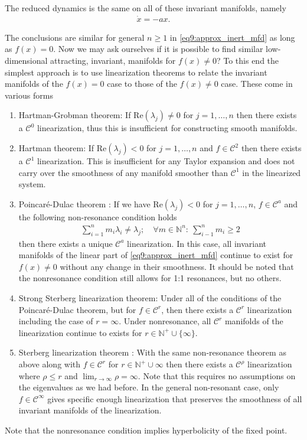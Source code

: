The reduced dynamics is the same on all of these invariant manifolds, namely
\begin{align}
	\dot{x} = -ax.
\end{align}

The conclusions are similar for general $n\geq 1$ in \ref{eq9:approx_inert_mfd} as long as $f(x) = 0$. Now we may ask ourselves if it is possible to find similar low-dimensional attracting, invariant, manifolds for $f(x) \neq 0$? To this end the simplest approach is to use linearization theorems to relate the invariant manifolds of the $f(x)=0$ case to those of the $f(x) \neq 0$ case. These come in various forms
\begin{enumerate}
	\item Hartman-Grobman theorem: If $ \textrm{Re} (\lambda_j) \neq 0$ for $j=1,\ldots,n$ then there exists a $\mathcal{C}^{0}$ linearization, thus this is insufficient for constructing smooth manifolds.
	\item Hartman theorem: If $ \textrm{Re} (\lambda_j)<0$ for $j=1,\ldots,n$ and $f\in \mathcal{C}^{2}$ then there exists a $\mathcal{C}^{1}$ linearization. This is insufficient for any Taylor expansion and does not carry over the smoothness of any manifold smoother than $\mathcal{C}^{1}$ in the linearized system.
	\item Poincaré-Dulac theorem \cite{poincare1951}: If we have $ \textrm{Re} (\lambda_j)<0$ for $j=1,\ldots,n$, $f\in \mathcal{C}^{a}$ and the following non-resonance condition holds
		\begin{align}
			\sum_{i=1}^{n} m_i \lambda_i \neq \lambda_j;\quad \forall m\in\mathbb{N}^{n}:\ \sum_{i-1}^{n} m_{i} \geq 2
		\end{align}
		then there exists a unique $\mathcal{C}^{a}$ linearization. In this case, all invariant manifolds of the linear part of \ref{eq9:approx_inert_mfd} continue to exist for $f(x)\neq 0$ without any change in their smoothness. It should be noted that the nonresonance condition still allows for 1:1 resonances, but no others.
	\item Strong Sterberg linearization theorem: Under all of the conditions of the Poincaré-Dulac theorem, but for $f\in \mathcal{C}^{r}$, then there exists a $\mathcal{C}^{r}$ linearization including the case of $r=\infty $. Under nonresonance, all $\mathcal{C}^{r}$ manifolds of the linearization continue to exists for $r \in \mathbb{N}^{+}\cup \{\infty \}$.
	\item Sterberg linearization theorem \cite{Sterberg1957}: With the same non-resonance theorem as above along with $f\in\mathcal{C}^{r}$ for $r \in \mathbb{N}^{+}\cup \infty $ then there exists a $\mathcal{C}^{\rho}$ linearization where $\rho\leq r$ and $\lim_{r\to \infty }\rho = \infty $. Note that this requires no assumptions on the eigenvalues as we had before. In the general non-resonant case, only $f\in \mathcal{C}^{\infty }$ gives specific enough linearization that preserves the smoothness of all invariant manifolds of the linearization.  
		
\end{enumerate}
\begin{remark}[]
	Note that the nonresonance condition implies hyperbolicity of the fixed point.
\end{remark}

